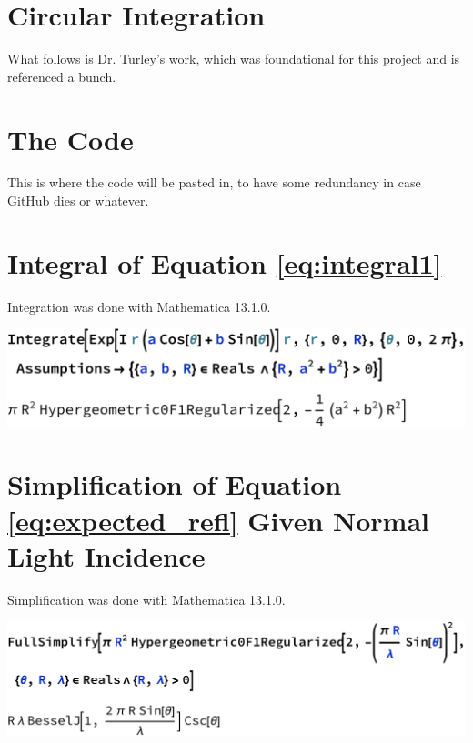\documentclass[etd,oneside,senior]{BYUPhys}
\begin{document}
\begin{appendices}

  \chapter{Circular Integration}\label{chap:circular_integration}
  
  What follows is Dr. Turley's work, which was foundational for this project and is referenced a bunch.
  
  
  
  
  
  \chapter{The Code}\label{chap:julia}
  
  This is where the code will be pasted in, to have some redundancy in case GitHub dies or whatever.
  
  
  
  \chapter{Integral of Equation \ref{eq:integral1}}\label{chap:integral}
  
  Integration was done with Mathematica 13.1.0.
  
  \includegraphics[width=\textwidth]{nasty-integral.pdf}
  
  
  
  \chapter{Simplification of Equation \ref{eq:expected_refl} Given Normal Light Incidence}\label{chap:airy_validation}
  
  Simplification was done with Mathematica 13.1.0.
  
  \includegraphics[width=\textwidth]{airy-simplification.pdf}
  
\end{appendices}








\printindex
\end{document}

